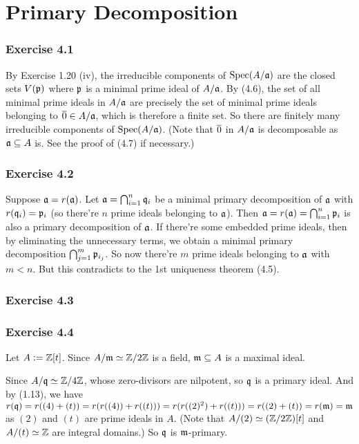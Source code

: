 \documentclass[../A&M.tex]{subfiles}
\begin{document}
\chapter{Primary Decomposition}

\subsection*{Exercise 4.1}

By Exercise 1.20 (iv), the irreducible components of $\operatorname{Spec}(A/\mathfrak{a})$ are the closed sets $V(\mathfrak{p})$ where $\mathfrak{p}$ is a minimal prime ideal of $A/\mathfrak{a}$. By (4.6), the set of all minimal prime ideals in $A/\mathfrak{a}$ are precisely the set of minimal prime ideals belonging to $\overline{0} \in A/\mathfrak{a}$, which is therefore a finite set. So there are finitely many irreducible components of $\operatorname{Spec}(A/\mathfrak{a})$. (Note that $\overline{0}$ in $A/\mathfrak{a}$ is decomposable as $\mathfrak{a} \subseteq A$ is. See the proof of (4.7) if necessary.)

\subsection*{Exercise 4.2}

Suppose $\mathfrak{a} = r(\mathfrak{a})$. Let $\mathfrak{a} = \bigcap_{i=1}^n \mathfrak{q}_i$ be a minimal primary decomposition of $\mathfrak{a}$ with $r(\mathfrak{q}_i)=\mathfrak{p}_i$ (so there're $n$ prime ideals belonging to $\mathfrak{a}$). Then $\mathfrak{a} = r(\mathfrak{a}) = \bigcap_{i=1}^n \mathfrak{p}_i$ is also a primary decomposition of $\mathfrak{a}$. If there're some embedded prime ideals, then by eliminating the unnecessary terms, we obtain a minimal primary decomposition $\bigcap_{j=1}^m \mathfrak{p}_{i_j}$. So now there're $m$ prime ideals belonging to $\mathfrak{a}$ with $m<n$. But this contradicts to the 1st uniqueness theorem (4.5).

\subsection*{Exercise 4.3}

\subsection*{Exercise 4.4}

Let $A:=\mathbb{Z}[t]$. Since $A/\mathfrak{m} \simeq \mathbb{Z}/2\mathbb{Z}$ is a field, $\mathfrak{m} \subseteq A$ is a maximal ideal.

Since $A/\mathfrak{q} \simeq \mathbb{Z}/4\mathbb{Z}$, whose zero-divisors are nilpotent, so $\mathfrak{q}$ is a primary ideal. And by (1.13), we have $r(\mathfrak{q}) = r((4)+(t)) = r( r((4)) + r((t)) ) = r( r((2)^2) + r((t)) ) = r( (2) + (t) ) = r(\mathfrak{m}) = \mathfrak{m}$ as $(2)$ and $(t)$ are prime ideals in $A$. (Note that $A/(2) \simeq (\mathbb{Z}/2\mathbb{Z})[t]$ and $A/(t) \simeq \mathbb{Z}$ are integral domains.) So $\mathfrak{q}$ is $\mathfrak{m}$-primary.
\end{document}
